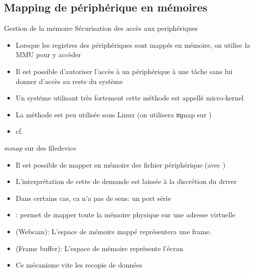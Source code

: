 \subsection{Mapping de périphérique en mémoires}

\begin{frame}{Gestion de la mémoire}
  Sécurisation des accès aux periphériques
  \begin{itemize}
  \item  Lorsque  les  registres  des  périphériques  sont  mappés  en
    mémoire, on utilise la MMU pour y accèder
  \item Il  est possible d'autoriser  l'accès à un périphérique  à une
    tâche sans lui donner d'accès au reste du système
  \item Un système utilisant  très fortement cette méthode est appellé
    micro-kernel
  \item La méthode est peu  utilisée sous Linux (on utilisera \c{mmap}
    sur )
  \item cf. 
  \end{itemize}
\end{frame}

\begin{frame}[fragile=singleslide]{\emph{mmap} sur des filedevice}
  \begin{itemize}
  \item Il est possible de  mapper en mémoire des fichier périphérique
    (avec )
  \item  L'interprétation  de  cette  de  demande  est  laissée  à  la
    discrétion du driver
  \item Dans certains cas, ca n'a pas de sens: un port série
  \item {}:  permet de mapper toute la  mémoire physique sur
    une adresse virtuelle
  \item   {}   (Webcam):   L'espace  de   mémoire   mappé
    représentera une frame.
  \item  {} (Frame buffer):  L'espace de  mémoire représente
    l'écran
  \item Ce mécanisme vite les recopie de données
  \end{itemize}
\end{frame}

